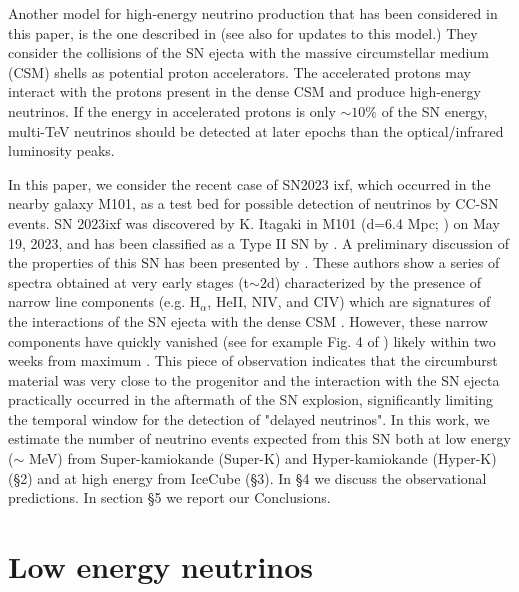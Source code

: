 \documentclass[twocolumn]{aastex631}
\begin{document}
Another model for high-energy neutrino production that has been considered in this paper, is the one described in \cite{Murase2011} (see also \citep{Murase2018,Murase2022,Murase2023,valtonen2023} for updates to this model.) They consider the collisions of the SN ejecta with the massive circumstellar medium (CSM) shells as potential proton accelerators. The accelerated protons may interact with the protons present in the dense CSM and produce high-energy neutrinos. If the energy in accelerated protons is only $\sim 10\%$ of the SN energy,  multi-TeV neutrinos should be detected at later epochs than the optical/infrared luminosity peaks.


In this paper, we consider the recent case of SN2023 ixf, which occurred in the nearby galaxy M101, as a test bed for possible detection of neutrinos by CC-SN events. SN 2023ixf was discovered by K. Itagaki in M101 (d=6.4 Mpc; \citep{Shappee2011}) on May 19, 2023, and has been classified as a Type II SN by \citep{Perley2023}. A preliminary discussion of the properties of this SN has been presented by \cite{Yamanaka2023}. These authors show a series of spectra obtained at very early stages (t$\sim 2$d) characterized by the presence of narrow line components (e.g. H$_\alpha$, HeII, NIV, and CIV) which are signatures of the interactions of the SN ejecta with the dense CSM \citep{Neustadt2023,Cappellaro2015,Jacobson-Galan2023} . However, these narrow components have quickly vanished (see for example Fig. 4 of \cite{Yamanaka2023}) likely within two weeks from maximum \citep{Bostroem2023}. This piece of observation  indicates that the circumburst material was very close to the progenitor and the interaction with the SN ejecta practically occurred in the aftermath of the SN explosion, significantly limiting the temporal window for the detection of "delayed neutrinos". In this work, we estimate the number of neutrino events expected from this SN both at low energy ($\sim$ MeV) from Super-kamiokande (Super-K) and Hyper-kamiokande (Hyper-K) (§2) and at high energy from IceCube (§3). In §4 we discuss the observational predictions. In section §5 we report our Conclusions. 

\section{Low energy neutrinos}
\end{document}
